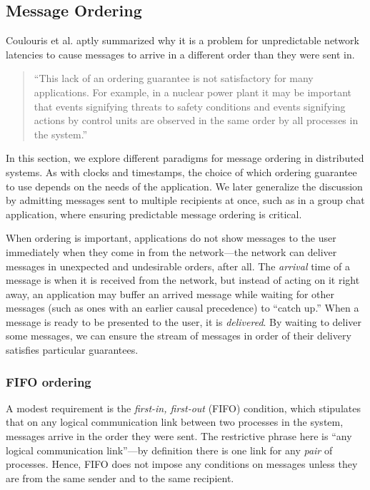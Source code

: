 \documentclass[]             %
{NASA}                       %
\theoremstyle{definition}
\begin{document}
\subsection{Message Ordering}
Coulouris et al. \cite{coulouris2005distributed} aptly summarized why
it is a problem for unpredictable network latencies to cause messages
to arrive in a different order than they were sent in.
\begin{quote}
  ``This lack of an ordering guarantee is not satisfactory for many
  applications. For example, in a nuclear power plant it may be
  important that events signifying threats to safety conditions and
  events signifying actions by control units are observed in the same
  order by all processes in the system.''
\end{quote}
In this section, we explore different paradigms for message ordering
in distributed systems. As with clocks and timestamps, the choice of
which ordering guarantee to use depends on the needs of the
application. We later generalize the discussion by admitting messages
sent to multiple recipients at once, such as in a group chat
application, where ensuring predictable message ordering is critical.

When ordering is important, applications do not show messages to the
user immediately when they come in from the network---the network can
deliver messages in unexpected and undesirable orders, after all. The
\emph{arrival} time of a message is when it is received from the
network, but instead of acting on it right away, an application may
buffer an arrived message while waiting for other messages (such as
ones with an earlier causal precedence) to ``catch up.'' When a
message is ready to be presented to the user, it is
\emph{delivered}. By waiting to deliver some messages, we can ensure
the stream of messages in order of their delivery satisfies particular
guarantees.

\subsubsection{FIFO ordering}
A modest requirement is the \emph{first-in, first-out} (FIFO)
condition, which stipulates that on any logical communication link
between two processes in the system, messages arrive in the order they
were sent. The restrictive phrase here is ``any logical communication
link''---by definition there is one link for any \emph{pair} of
processes. Hence, FIFO does not impose any conditions on messages
unless they are from the same sender and to the same recipient.
\end{document}
